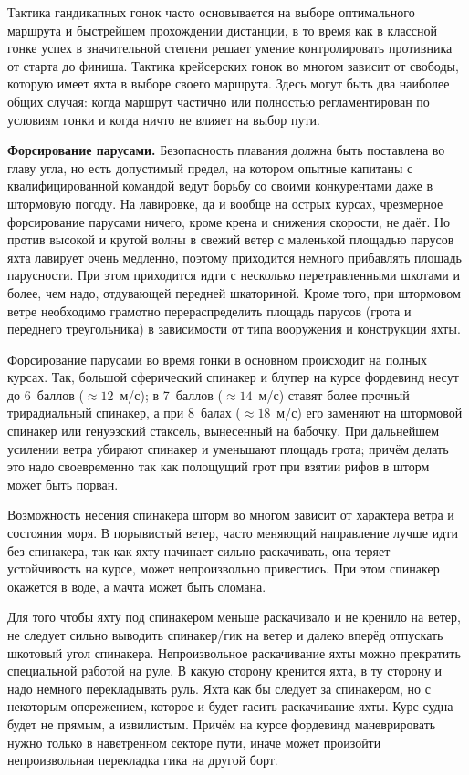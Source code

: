 Тактика гандикапных гонок часто основывается на выборе оптимального
маршрута и быстрейшем прохождении дистанции, в то время как в классной
гонке успех в значительной степени решает умение контролировать
противника от старта до финиша. Тактика крейсерских гонок во многом
зависит от свободы, которую имеет яхта в выборе своего маршрута. Здесь
могут быть два наиболее общих случая: когда маршрут частично или
полностью регламентирован по условиям гонки и когда ничто не влияет на
выбор пути.

\textbf{Форсирование парусами.} Безопасность плавания должна быть
поставлена во главу угла, но есть допустимый предел, на котором
опытные капитаны с квалифицированной командой ведут борьбу со своими
конкурентами даже в штормовую погоду. На лавировке, да и вообще на
острых курсах, чрезмерное форсирование парусами ничего, кроме крена и
снижения скорости, не даёт. Но против высокой и крутой волны в свежий
ветер с маленькой площадью парусов яхта лавирует очень медленно,
поэтому приходится немного прибавлять площадь парусности. При этом
приходится идти с несколько перетравленными шкотами и более, чем надо,
отдувающей передней шкаториной. Кроме того, при штормовом ветре
необходимо грамотно перераспределить площадь парусов (грота и
переднего треугольника) в зависимости от типа вооружения и конструкции
яхты.

Форсирование парусами во время гонки в основном происходит на полных
курсах. Так, большой сферический спинакер и блупер на курсе фордевинд
несут до 6~баллов ($\approx 12$~м/с); в 7~баллов ($\approx 14$~м/с)
ставят более прочный трирадиальный спинакер, а при 8~балах
($\approx 18$~м/с) его заменяют на штормовой спинакер или генуэзский
стаксель, вынесенный на бабочку. При дальнейшем усилении ветра убирают
спинакер и уменьшают площадь грота; причём делать это надо
своевременно так как полощущий грот при взятии рифов в шторм может
быть порван.

Возможность несения спинакера шторм во многом зависит от характера
ветра и состояния моря. В порывистый ветер, часто меняющий направление
лучше идти без спинакера, так как яхту начинает сильно раскачивать,
она теряет устойчивость на курсе, может непроизвольно привестись. При
этом спинакер окажется в воде, а мачта может быть сломана.

Для того чтобы яхту под спинакером меньше раскачивало и не кренило на
ветер, не следует сильно выводить спинакер\-/гик на ветер и далеко
вперёд отпускать шкотовый угол спинакера. Непроизвольное раскачивание
яхты можно прекратить специальной работой на руле. В какую сторону
кренится яхта, в ту сторону и надо немного перекладывать руль. Яхта
как бы следует за спинакером, но с некоторым опережением, которое и
будет гасить раскачивание яхты. Курс судна будет не прямым, а
извилистым. Причём на курсе фордевинд маневрировать нужно только в
наветренном секторе пути, иначе может произойти непроизвольная
перекладка гика на другой борт.

